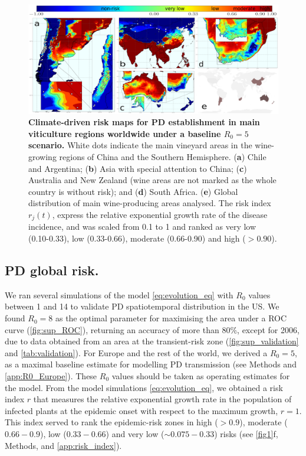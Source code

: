     \begin{figure}[t!]
        \centering
        \includegraphics[width=1\textwidth]{Figures/Fig3.pdf}
        \caption{\textbf{Climate-driven risk maps for PD establishment in main
                viticulture regions worldwide under a baseline $R_0 = 5$
                scenario.} White dots
            indicate the main vineyard areas in the wine-growing regions of
            China and the
            Southern Hemisphere. (\textbf{a}) Chile and Argentina; (\textbf{b})
            Asia with
            special attention to China; (\textbf{c}) Australia and New Zealand
            (wine areas
            are not marked as the whole country is without risk); and
            (\textbf{d}) South
            Africa. (\textbf{e}) Global distribution of main wine-producing
            areas analysed.
            The risk index $r_j(t)$, express the relative exponential growth
            rate of the
            disease incidence, and was scaled from 0.1 to 1 and ranked as very
            low
            (0.10-0.33), low (0.33-0.66), moderate (0.66-0.90) and high ($>
                0.90$).}
        \label{fig3}
    \end{figure}

    \subsection{PD global risk.}
    We ran several simulations of the model \cref{eq:evolution_eq} with $R_0$
    values between 1 and 14 to validate PD spatiotemporal distribution in the
    US.
    We found $R_0=8$ as the optimal parameter for maximising the area under a
    ROC
    curve (\cref{fig:sup_ROC}), returning an accuracy of more than $80 \%$,
    except for 2006, due to data obtained from an area at the transient-risk
    zone
    (\cref{fig:sup_validation} and \cref{tab:validation}). For Europe and the
    rest
    of
    the world, we derived a $R_0=5$, as a maximal baseline estimate for
    modelling
    PD transmission (see Methods and \cref{app:R0_Europe}). These $R_0$
    values should be taken as operating estimates for the model.  From the
    model
    simulations \cref{eq:evolution_eq}, we obtained a risk index $r$ that
    measures
    the relative exponential growth rate in the population of infected plants
    at
    the epidemic onset with respect to the maximum growth, $r=1$. This index
    served
    to rank the epidemic-risk zones in high ($> 0.9$), moderate ($0.66-0.9$),
    low
    ($0.33-0.66$) and very low ($\sim 0.075-0.33$) risks (see \cref{fig1}f,
    Methods, and \cref{app:risk_index}).

